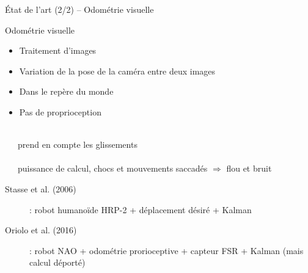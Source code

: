 \begin{frame}{État de l'art (2/2) -- Odométrie visuelle}
    \begin{block}{Odométrie visuelle}
        \begin{itemize}
            \item Traitement d'images
            \item Variation de la pose de la caméra entre deux images
            \item Dans le repère du monde
            \item Pas de proprioception
        \end{itemize}
    \end{block}
    \\
    ~~~prend en compte les glissements\\
    \\
    ~~~puissance de calcul, chocs et mouvements saccadés $\Rightarrow$ flou et bruit\\
    \vspace{1.0em}
    \begin{description}
        \item[Stasse et al. (2006)] : 
            robot humanoïde HRP-2 + déplacement désiré + Kalman
        \item[Oriolo et al. (2016)] : 
            robot NAO + odométrie prorioceptive + capteur FSR + Kalman (mais calcul déporté)
    \end{description}
\end{frame}


